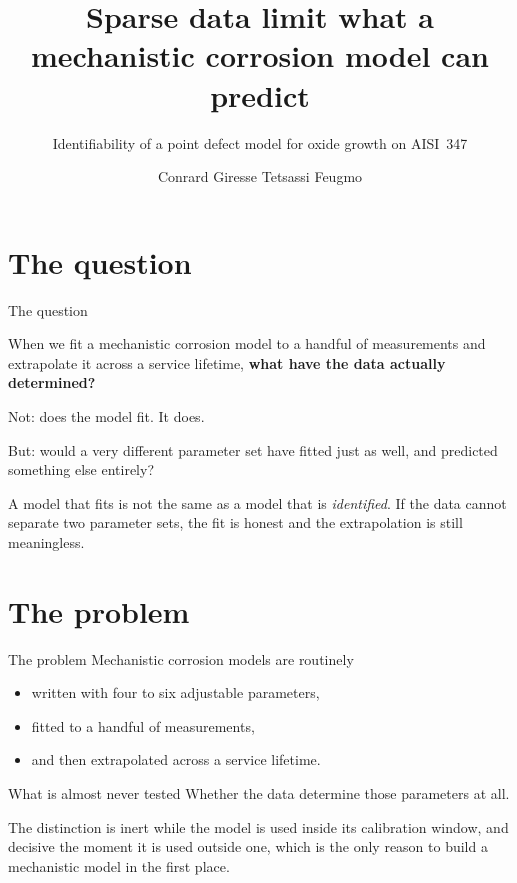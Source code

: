 \documentclass[aspectratio=169,10pt]{beamer}
\title{Sparse data limit what a mechanistic corrosion model can predict}
\subtitle{Identifiability of a point defect model for oxide growth on AISI~347}
\author{Conrard Giresse Tetsassi Feugmo}
\institute{Department of Chemistry, Department of Physics \& Astronomy\\University of Waterloo}
\date{}
\begin{document}
\maketitle

\section{The question}

\begin{frame}{The question}
\begin{block}{}
\large
When we fit a mechanistic corrosion model to a handful of measurements and
extrapolate it across a service lifetime, \textbf{what have the data
actually determined?}
\end{block}

\vspace{1.0em}
Not: does the model fit. It does.

\vspace{0.4em}
But: would a very different parameter set have fitted just as well, and
predicted something else entirely?

\vspace{1.0em}
\small
A model that fits is not the same as a model that is \emph{identified}.
If the data cannot separate two parameter sets, the fit is honest and the
extrapolation is still meaningless.
\end{frame}

\section{The problem}

\begin{frame}{The problem}
Mechanistic corrosion models are routinely
\begin{itemize}
  \item written with four to six adjustable parameters,
  \item fitted to a handful of measurements,
  \item and then extrapolated across a service lifetime.
\end{itemize}

\vspace{0.6em}
\begin{alertblock}{What is almost never tested}
Whether the data determine those parameters at all.
\end{alertblock}

\vspace{0.8em}
The distinction is inert while the model is used inside its calibration
window, and decisive the moment it is used outside one, which is the only
reason to build a mechanistic model in the first place.
\end{frame}
\end{document}
